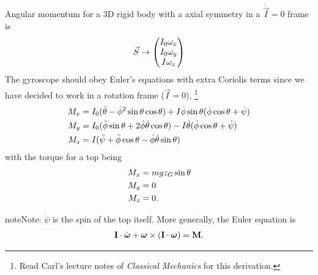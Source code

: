 \documentclass[letterpaper,12pt,english]{sphinxmanual}
\begin{document}
Angular momentum for a 3D rigid body with a axial symmetry in a \(\dot {\vec I}=0\) frame is
\begin{gather}
\begin{split}\vec S \to \begin{pmatrix} I_0 \omega_x \\ I_0 \omega_y \\ I\omega_z \end{pmatrix}\end{split}\notag
\end{gather}
The gyroscope should obey Euler's equations with extra Coriolis terms since we have decided to work in a rotation frame (\(\dot{\vec I}=0\)), \footnote{
Read Carl's lecture notes of \emph{Classical Mechanics} for this derivation.
}
\begin{gather}
\begin{split}M_x &= I_0 (\ddot \theta - \dot \phi^2\sin\theta \cos\theta) + I \dot \phi \sin\theta (\dot\phi\cos\theta + \dot \psi) \\
M_y & =  I_0 (\ddot \phi \sin\theta + 2 \dot \phi \dot\theta \cos\theta) - I \dot \theta (\dot \phi \cos\theta + \dot \psi) \\
M_z & = I (\ddot \psi + \ddot \phi \cos\theta - \dot\phi \dot \theta \sin\theta)\end{split}\notag
\end{gather}
with the torque for a top being
\begin{gather}
\begin{split}M_x & = m g z_G \sin\theta \\
M_y & = 0 \\
M_z & = 0 .\end{split}\notag
\end{gather}
\begin{notice}{note}{Note:}
\(\dot \psi\) is the spin of the top itself. More generally, the Euler equation is
\begin{gather}
\begin{split}\mathbf{I} \cdot \dot{\boldsymbol\omega} + \boldsymbol\omega \times \left( \mathbf{I} \cdot \boldsymbol\omega \right) = \mathbf{M}.\end{split}\notag
\end{gather}\end{notice}
\end{document}
